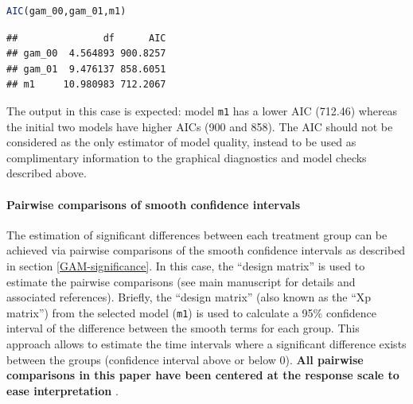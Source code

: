 \documentclass[
]{article}
\newcommand{\passthrough}[1]{#1}
\begin{document}
\begin{lstlisting}[language=R]
AIC(gam_00,gam_01,m1)
\end{lstlisting}

\begin{lstlisting}
##               df      AIC
## gam_00  4.564893 900.8257
## gam_01  9.476137 858.6051
## m1     10.980983 712.2067
\end{lstlisting}

The output in this case is expected: model \passthrough{\lstinline!m1!} has a lower AIC (712.46) whereas the initial two models have higher AICs (900 and 858). The AIC should not be considered as the only estimator of model quality, instead to be used as complimentary information to the graphical diagnostics and model checks described above.

\hypertarget{pairwise-comparisons-of-smooth-confidence-intervals}{%
\paragraph{Pairwise comparisons of smooth confidence intervals}\label{pairwise-comparisons-of-smooth-confidence-intervals}}

The estimation of significant differences between each treatment group can be achieved via pairwise comparisons of the smooth confidence intervals as described in section \ref{GAM-significance}. In this case, the ``design matrix'' is used to estimate the pairwise comparisons (see main manuscript for details and associated references). Briefly, the ``design matrix'' (also known as the ``Xp matrix'') from the selected model (\passthrough{\lstinline!m1!}) is used to calculate a 95\% confidence interval of the difference between the smooth terms for each group. This approach allows to estimate the time intervals where a significant difference exists between the groups (confidence interval above or below 0). \textbf{All pairwise comparisons in this paper have been centered at the response scale to ease interpretation }.
\end{document}
